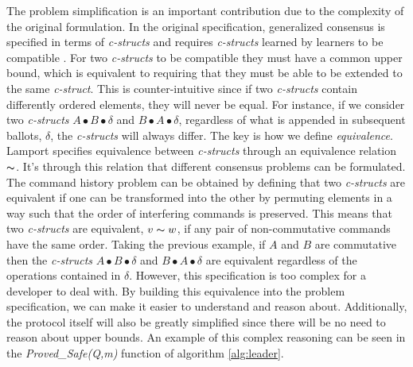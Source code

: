 The problem simplification is an important contribution due to the complexity of the original formulation. In the original specification, generalized consensus is specified in terms of \textit{c-structs} and requires \textit{c-structs} learned by learners to be compatible \cite{Lamport2005}. For two \textit{c-structs} to be compatible they must have a common upper bound, which is equivalent to requiring that they must be able to be extended to the same \textit{c-struct}. This is counter-intuitive since if two \textit{c-structs} contain differently ordered elements, they will never be equal. For instance, if we consider two \textit{c-structs} $A \bullet B \bullet \delta$ and $B \bullet A \bullet \delta$, regardless of what is appended in subsequent ballots, $\delta$, the \textit{c-structs} will always differ. The key is how we define \textit{equivalence}. Lamport specifies equivalence between \textit{c-structs} through an equivalence relation $\thicksim$. It's through this relation that different consensus problems can be formulated. The command history problem can be obtained by defining that two \textit{c-structs} are equivalent if one can be transformed into the other by permuting elements in a way such that the order of interfering commands is preserved. This means that two \textit{c-structs} are equivalent, $v \thicksim w$, if any pair of non-commutative commands have the same order. Taking the previous example, if $A$ and $B$ are commutative then the \textit{c-structs} $A \bullet B \bullet \delta$ and $B \bullet A \bullet \delta$ are equivalent regardless of the operations contained in $\delta$. However, this specification is too complex for a developer to deal with. By building this equivalence into the problem specification, we can make it easier to understand and reason about. Additionally, the protocol itself will also be greatly simplified since there will be no need to reason about upper bounds. An example of this complex reasoning can be seen in the \textit{Proved\_Safe(Q,m)} function of algorithm \ref{alg:leader}.

